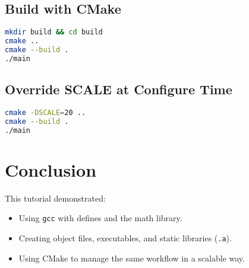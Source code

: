 \documentclass[11pt,a4paper]{article}
\begin{document}
\subsection{Build with CMake}
\begin{lstlisting}[language=bash]
mkdir build && cd build
cmake ..
cmake --build .
./main
\end{lstlisting}

\subsection{Override SCALE at Configure Time}
\begin{lstlisting}[language=bash]
cmake -DSCALE=20 ..
cmake --build .
./main
\end{lstlisting}

\section{Conclusion}
This tutorial demonstrated:
\begin{itemize}
  \item Using \texttt{gcc} with defines and the math library.
  \item Creating object files, executables, and static libraries (\texttt{.a}).
  \item Using CMake to manage the same workflow in a scalable way.
\end{itemize}
\end{document}
